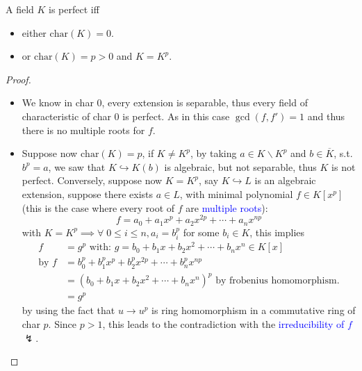 \begin{proposition}
	A field \( K \) is perfect iff
	\begin{itemize}
		\item either \( \text{char}(K) = 0 \).
		\item or \( \text{char}(K) = p > 0 \) and \( K = K^p \).
	\end{itemize}
\end{proposition}

\begin{proof}
	\leavevmode
	\begin{itemize}
		\item We know in char \( 0 \), every extension is separable, thus every field of characteristic of char
		      \( 0 \) is perfect. As in this case \( \gcd(f,f') = 1 \) and thus there is no multiple roots for \( f \).
		\item Suppose now \( \text{char}(K) = p \), if \( K \ne K^p \), by taking \( a\in K
		      \smallsetminus K^p \) and \( b \in \overline{K} \), s.t. \( b^p = a \), we saw that \( K
		      \hookrightarrow K(b) \) is algebraic, but not separable, thus \( K \) is not perfect.
		      Conversely, suppose now \( K = K^p \), say \( K \hookrightarrow L \) is an algebraic
		      extension, suppose there exists \( a\in L \), with minimal polynomial \( f \in K[x^p] \) (this
		      is the case where every root of \( f \) are \textcolor{blue}{multiple roots}):
		      \[
			      f = a_0 + a_1 x^p + a_2 x^{2p} + \cdots + a_n x^{np}
		      \]
		      with \( K = K^p \implies \forall \; 0\leq i \leq n, a_i = b_i^p \) for some \( b_i \in K \),
		      this implies
		      \[
			      \begin{aligned}
				      f            & = g^p \text{ with: } g = b_0 + b_1 x + b_2 x^2 + \cdots + b_n x^n \in K[x]        \\
				      \text{by } f & = b_0^p + b_1^p x^p + b_2^p x^{2p} + \cdots + b_n^p x^{np}                        \\
				                   & = (b_0 + b_1 x + b_2 x^2 + \cdots + b_n x^n)^p \text{ by frobenius homomorphism.} \\
				                   & = g^p
			      \end{aligned}
		      \]
		      by using the fact that \( u \to u^p \) is ring homomorphism in a commutative ring of char \( p \). Since \( p > 1 \), this leads to
		      the contradiction with the \textcolor{blue}{irreducibility of \( f \)} \( \lightning \).
	\end{itemize}
\end{proof}


